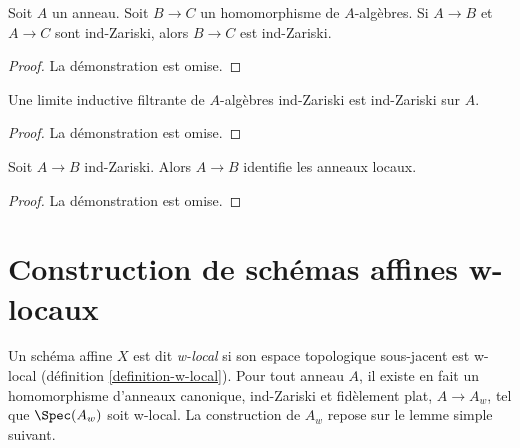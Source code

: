\begin{lemma}
\label{lemma-ind-zariski-permanence}
Soit $A$ un anneau. Soit $B \to C$ un homomorphisme de $A$-alg\`ebres.
Si $A \to B$ et $A \to C$ sont ind-Zariski, alors $B \to C$
est ind-Zariski.
\end{lemma}

\begin{proof}
La d\'emonstration est omise.
\end{proof}

\begin{lemma}
\label{lemma-ind-ind-zariski}
Une limite inductive filtrante de $A$-alg\`ebres ind-Zariski est ind-Zariski sur $A$.
\end{lemma}

\begin{proof}
La d\'emonstration est omise.
\end{proof}

\begin{lemma}
\label{lemma-ind-zariski-implies}
Soit $A \to B$ ind-Zariski. Alors $A \to B$ identifie les anneaux locaux.
\end{lemma}

\begin{proof}
La d\'emonstration est omise.
\end{proof}







\section{Construction de sch\'emas affines w-locaux}
\label{section-construction}

\noindent
Un sch\'ema affine $X$ est dit {\it w-local} si son espace topologique
sous-jacent est w-local (d\'efinition \ref{definition-w-local}).
Pour tout anneau $A$, il existe en fait un homomorphisme d'anneaux canonique, ind-Zariski
et fid\`element plat, $A \to A_w$, tel que $\Spec(A_w)$ soit
w-local. La construction de $A_w$ repose sur le lemme simple suivant.

